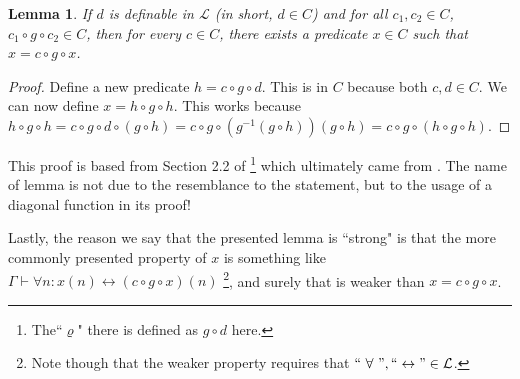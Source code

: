 \documentclass{article}
\newtheorem{lemma}[theorem]{Lemma}
\begin{document}
\begin{lemma}
If $d$ is definable in $\mathcal{L}$ (in short, $d \in C$) and for all $c_1, c_2 \in C$, $c_1 \circ g \circ c_2 \in C$, then for every $c \in C$, there exists a predicate $x \in C$ such that $x = c \circ g \circ x$.
\end{lemma}
\begin{proof}
Define a new predicate $h = c \circ g \circ d$. This is in $C$ because both $c, d \in C$. We can now define $x = h \circ g \circ h$. This works because $h \circ g \circ h = c \circ g \circ d \circ (g \circ h) = c \circ g \circ (g^{-1}(g \circ h))(g \circ h) = c \circ g \circ (h \circ g \circ h)$.
\end{proof}

This proof is based from Section 2.2 of \cite{salehi} \footnote{The``$\varrho$" there is defined as $g \circ d$ here.} which ultimately came from \cite{jeroslow}. The name of lemma is not due to the resemblance to the statement, but to the usage of a diagonal function in its proof!

Lastly, the reason we say that the presented lemma is ``strong" is that the more commonly presented property of $x$ is something like $\Gamma \vdash \forall n: x(n) \leftrightarrow (c \circ g \circ x)(n)$ \footnote{Note though that the weaker property requires that $``\ \forall\ ", ``\leftrightarrow" \in \mathcal{L}$.}, and surely that is weaker than $x = c \circ g \circ x$.



\end{document}
